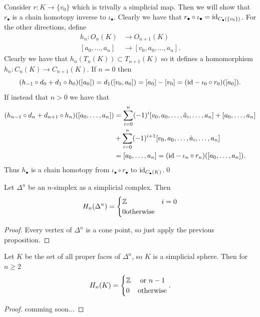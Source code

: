 \documentclass{article}
\begin{document}
\pf Consider $ r: K \to \{v_0\} $ which is trivally a simplicial map. Then we will show that $ r_\bullet $ is a chain homotopy inverse to $ \iota_\bullet $. Clearly we have that $ r_\bullet \circ \iota_\bullet = \mathrm{id}_{C_\bullet(\{v_0\})} $. For the other directions, define
\begin{align*}
	h_n: O_n(K) &\to O_{n+1}(K) \\
		    [a_0,\dots, a_n] &\to [v_0, a_0,\dots, a_n].
\end{align*}
Clearly we have that $ h_n(T_n(K))\subset T_{n+1}(K) $ so it defines a homomorphism $ h_n: C_n(K) \to C_{n+1}(K) $. If $ n = 0 $ then
\[
	(h_{-1} \circ d_0 + d_1 \circ h_0)([a_0]) = d_1([v_0,a_0]) = [a_0] - [v_0] = (\mathrm{id} - \iota_0 \circ r_0)([a_0]).
\]
If instead that $ n>0 $ we  have that 
\begin{align*}
	(h_{n-1} \circ d_n + d_{n+1} \circ h_n)([a_0,\dots, a_n]) &= \sum_{i=0}^n (-1)^i [v_0,a_0,\dots, \hat a_i, \dots, a_n] + [a_0,\dots, a_n
] \\
								  &+ \sum_{i=0}^n (-1)^{i+1}[v_0,a_0,\dots, \hat a_i, \dots, a_n] \\
								  &= [a_0,\dots, a_n] = (\mathrm{id} - \iota_n \circ r_n)([a_0,\dots, a_n]).
\end{align*}
Thus $ h_\bullet $ is a chain homotopy from $ \iota_\bullet \circ r_\bullet $ to $ \mathrm{id}_{C_{\bullet}(K)} $.\qed
\begin{corollary}
  Let $ \Delta^n $ be an $ n $-simplex as a simplicial complex. Then 
  \[
    H_n(\Delta^n) = \begin{cases}
	    \mathbb{Z} & i = 0\\
	    0 \text{otherwise}
    \end{cases}
  \]
\end{corollary}
\begin{proof}
  Every vertex of $ \Delta^n $ is a cone point, so just apply the previous proposition. 
\end{proof}
\begin{corollary}
  Let $ K $ be the set of all proper faces of $ \Delta^n $, so $ K $ is a simplicial sphere. Then for $ n \ge 2 $
  \[
    H_n(K) = \begin{cases}
	    \mathbb{Z} & \ \text{or} \ n -1 \\
	    0 & \text{otherwise}
    \end{cases}.
  \]
\end{corollary}
\begin{proof}
	comming soon...
  \end{proof}
\end{document}
